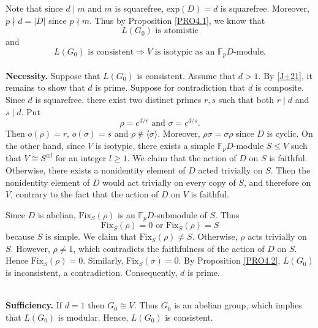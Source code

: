\documentclass[12pt]{article}
\begin{document}
Note that since $d\mid m$ and $m$ is squarefree, $\mbox{exp}(D)=d$ is squarefree. Moreover, $p\nmid d=|D|$ since $p\nmid m$. Thus by 
Proposition \ref{PRO4.1}, we know that  
\begin{equation}\label{J+1}
L(G_0) \mbox{ is atomistic}
\end{equation} 
and
\begin{equation}\label{J+21}
 L(G_0) \mbox{ is consistent} \Longrightarrow V \mbox{ is isotypic as an } \mathbb{F}_pD\mbox{-module.}
\end{equation}
\quad\\
\textbf{Necessity.} Suppose that $L(G_0)$ is consistent. 
Assume that $d>1$. 
By \eqref{J+21}, it remains to show that $d$ is prime. 
Suppose for contradiction that $d$ is composite. 
Since $d$ is squarefree, there exist two distinct primes $r, s$ 
such that both $r\mid d$ and $s\mid d$. Put $$\rho=c^{d/r}\mbox{ and }\sigma=c^{d/s}.$$ 
Then $o(\rho)=r$, $o(\sigma)=s$ and $\rho\notin \langle \sigma\rangle$. 
Moreover, $\rho\sigma=\sigma\rho$ since $D$ is cyclic. 
On the other hand, since $V$ is isotypic, there exists a simple $\mathbb{F}_p D$-module $S\leq V$ such that $V\cong S^{\oplus l}$ for an integer $l\geq 1$.
We claim that the action of $D$ on $S$ is faithful. Otherwise, there exists a nonidentity 
element of $D$ acted trivially on $S$. Then the nonidentity 
element of $D$ would act trivially 
on every copy of $S$, and therefore on $V$, contrary to the fact 
that the action of $D$ on $V$ is faithful. 

Since $D$ is abelian, $\mbox{Fix}_{S}(\rho)$ is 
an $\mathbb{F}_pD$-submodule of $S$. Thus 
$$\mbox{Fix}_{S}(\rho)=0 \mbox{ or }\mbox{Fix}_{S}(\rho)=S$$ 
because $S$ is simple. We claim that $\mbox{Fix}_{S}(\rho)\neq S$. 
Otherwise, $\rho$ acts trivially on $S$. 
However, $\rho\neq 1$, which contradicts the 
faithfulness of the action of $D$ on $S$. 
Hence $\mbox{Fix}_{S}(\rho)=0$. 
Similarly, $\mbox{Fix}_{S}(\sigma)=0$. By Proposition \ref{PRO4.2}, $L(G_0)$ is inconsistent, a contradiction. Consequently, $d$ is prime. 

\quad\\
\textbf{Sufficiency.} If $d=1$ then $G_0\cong V$. Thus $G_0$ is an abelian group, which implies that $L(G_0)$ is modular. Hence, $L(G_0)$ is consistent. 
\end{document}
